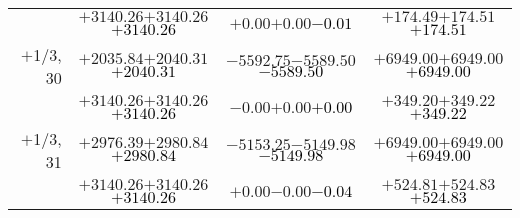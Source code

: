 \documentclass[compress]{beamer}
\begin{document}
\begin{frame}
{\begin{tabular}{r | c | c | c}
           & $+3140.26$\hspace{0.1 cm}$+3140.26$\hspace{0.1 cm}\textcolor{black}{$+3140.26$} & $+0.00$\hspace{0.1 cm}$+0.00$\hspace{0.1 cm}\textcolor{black}{$-0.01$} & $+174.49$\hspace{0.1 cm}$+174.51$\hspace{0.1 cm}\textcolor{black}{$+174.51$} \\
$+$1/3, 30 & $+2035.84$\hspace{0.1 cm}$+2040.31$\hspace{0.1 cm}\textcolor{black}{$+2040.31$} & $-5592.75$\hspace{0.1 cm}$-5589.50$\hspace{0.1 cm}\textcolor{black}{$-5589.50$} & $+6949.00$\hspace{0.1 cm}$+6949.00$\hspace{0.1 cm}\textcolor{black}{$+6949.00$} \\
           & $+3140.26$\hspace{0.1 cm}$+3140.26$\hspace{0.1 cm}\textcolor{black}{$+3140.26$} & $-0.00$\hspace{0.1 cm}$+0.00$\hspace{0.1 cm}\textcolor{black}{$+0.00$} & $+349.20$\hspace{0.1 cm}$+349.22$\hspace{0.1 cm}\textcolor{black}{$+349.22$} \\
$+$1/3, 31 & $+2976.39$\hspace{0.1 cm}$+2980.84$\hspace{0.1 cm}\textcolor{black}{$+2980.84$} & $-5153.25$\hspace{0.1 cm}$-5149.98$\hspace{0.1 cm}\textcolor{black}{$-5149.98$} & $+6949.00$\hspace{0.1 cm}$+6949.00$\hspace{0.1 cm}\textcolor{black}{$+6949.00$} \\
           & $+3140.26$\hspace{0.1 cm}$+3140.26$\hspace{0.1 cm}\textcolor{black}{$+3140.26$} & $+0.00$\hspace{0.1 cm}$-0.00$\hspace{0.1 cm}\textcolor{black}{$-0.04$} & $+524.81$\hspace{0.1 cm}$+524.83$\hspace{0.1 cm}\textcolor{black}{$+524.83$} \\

\end{tabular}}
\end{frame}
\end{document}
